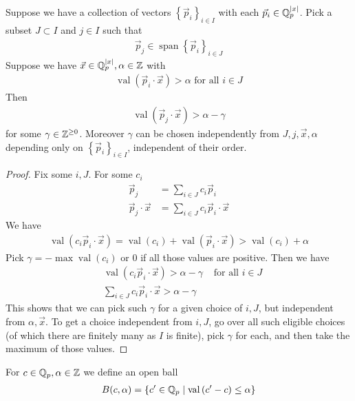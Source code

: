 \documentclass{amsart}
\newcommand{\curly}[1]{\left\{#1\right\}}
\newcommand{\paren}[1]{\left(#1\right)}
\DeclareMathOperator{\vecspan}{span}
\DeclareMathOperator{\val}{val}
\begin{document}
\begin{Lemma}	 \label{gamma}
	Suppose we have a collection of vectors $\curly{\vec p_i}_{i \in I}$ with each $\vec p_i \in \mathbb{Q}_p^{|x|}$.
	Pick a subset $J \subset I$ and $j \in I$ such that
	\begin{align*}
		\vec p_j \in \vecspan \curly{\vec p_i}_{i \in J} 
	\end{align*}
	Suppose we have $\vec x \in \mathbb{Q}_p^{|x|}, \alpha \in \mathbb{Z}$ with
	\begin{align*}
		\val(\vec p_i \cdot \vec x) > \alpha \text{ for all } i \in J
	\end{align*}
	Then
	\begin{align*}
		\val(\vec p_j \cdot \vec x) > \alpha - \gamma
	\end{align*}
	for some $\gamma \in \mathbb{Z}^{\geq 0}$.
	Moreover $\gamma$ can be chosen independently from $J, j, \vec x, \alpha$ depending only on $\curly{\vec p_i}_{i \in I}$, independent of their order.
\end{Lemma}
\begin{proof}
	Fix some $i, J$.
	For some $c_i$
	\begin{align*}
		\vec p_j &= \sum_{i \in J} c_i \vec p_i \\
		\vec p_j \cdot \vec x &= \sum_{i \in J} c_i \vec p_i \cdot \vec x
	\end{align*}
	We have
	\begin{align*}
		\val \paren{c_i \vec p_i \cdot \vec x} = \val \paren{c_i} + \val \paren{\vec p_i \cdot \vec x} > \val \paren{c_i} + \alpha
	\end{align*}
	Pick $\gamma = -\max \val \paren{c_i}$ or $0$ if all those values are positive.
	Then we have 
	\begin{align*}
		&\val \paren{c_i \vec p_i \cdot \vec x} > \alpha - \gamma &\text{ for all $i \in J$}\\
		&\sum_{i \in J} c_i \vec p_i \cdot \vec x > \alpha - \gamma
	\end{align*}
	This shows that we can pick such $\gamma$ for a given choice of $i, J$, but independent from $\alpha, \vec x$.
	To get a choice independent from $i, J$, go over all such eligible choices (of which there are finitely many as $I$ is finite),
	pick $\gamma$ for each, and then take the maximum of those values.
\end{proof}

\begin{Definition}
	For $c \in \mathbb{Q}_p, \alpha \in \mathbb{Z}$ we define an open ball 
	\begin{align*}
		B(c, \alpha) = \curly{c' \in \Q_p \mid \val \paren{c' - c} \leq \alpha}
	\end{align*}
\end{Definition}
\end{document}

